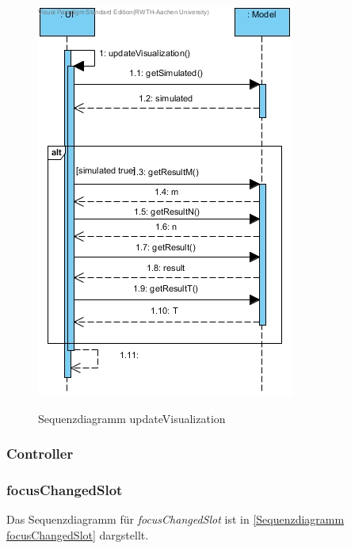 \begin{figure}[H]
	\centering
	\includegraphics[scale=.6]{Bilder/UI__updateVisualization().jpg}\\
	\caption{Sequenzdiagramm updateVisualization}
	\label{Sequenzdiagramm updateVisualization}
\end{figure}

\subsubsection{Controller}

\subsubsection*{focusChangedSlot}

Das Sequenzdiagramm für \emph{focusChangedSlot} ist in \ref{Sequenzdiagramm focusChangedSlot} dargstellt.

